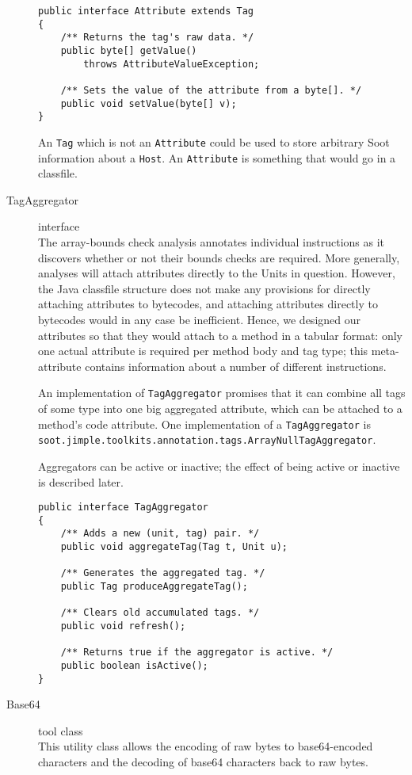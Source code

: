 \documentclass{article}
\begin{document}
\begin{description}
\begin{verbatim}
public interface Attribute extends Tag
{
    /** Returns the tag's raw data. */
    public byte[] getValue() 
        throws AttributeValueException;

    /** Sets the value of the attribute from a byte[]. */
    public void setValue(byte[] v);
}
\end{verbatim}

An {\tt Tag} which is not an {\tt Attribute} could be used
to store arbitrary Soot information about a {\tt Host}.  An {\tt Attribute}
is something that would go in a classfile.

\item[TagAggregator] interface\\ The array-bounds check analysis
annotates individual instructions as it discovers whether or not their
bounds checks are required.  More generally, analyses will attach
attributes directly to the Units in question.  However, the Java
classfile structure does not make any provisions for directly attaching
attributes to bytecodes, and attaching attributes directly to
bytecodes would in any case be inefficient.  Hence, we designed our
attributes so that they would attach to a method in a tabular
format: only one actual attribute is required per method body and tag
type; this meta-attribute contains information about a number of
different instructions.

An implementation of {\tt TagAggregator} promises that it can combine
all tags of some type into one big aggregated attribute, which can be
attached to a method's code attribute.  One implementation of a 
{\tt TagAggregator} is 
{\tt soot.jimple.toolkits.annotation.tags.ArrayNullTagAggregator}.

Aggregators can be active or inactive; the effect of being active or
inactive is described later.

\begin{verbatim}
public interface TagAggregator 
{
    /** Adds a new (unit, tag) pair. */
    public void aggregateTag(Tag t, Unit u);

    /** Generates the aggregated tag. */    
    public Tag produceAggregateTag();

    /** Clears old accumulated tags. */
    public void refresh();

    /** Returns true if the aggregator is active. */
    public boolean isActive();
}
\end{verbatim}
  
\item[Base64] tool class\\
This utility class allows the encoding of raw bytes to base64-encoded 
characters and the decoding of base64 characters back to raw bytes.
    

\end{description}
\end{document}
